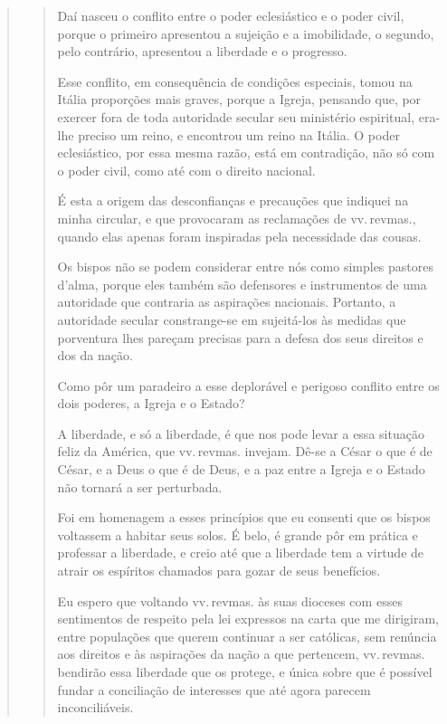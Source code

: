 \begin{quote}
\begin{quote}
Daí nasceu o conflito entre o poder eclesiástico e o poder civil, porque
o primeiro apresentou a sujeição e a imobilidade, o segundo, pelo
contrário, apresentou a liberdade e o progresso.

Esse conflito, em consequência de condições especiais, tomou na Itália
proporções mais graves, porque a Igreja, pensando que, por exercer fora
de toda autoridade secular seu ministério espiritual, era-lhe preciso um
reino, e encontrou um reino na Itália. O poder eclesiástico, por essa
mesma razão, está em contradição, não só com o poder civil, como até com
o direito nacional.

É esta a origem das desconfianças e precauções que indiquei na minha
circular, e que provocaram as reclamações de vv.\,revmas., quando elas
apenas foram inspiradas pela necessidade das cousas.

Os bispos não se podem considerar entre nós como simples pastores
d'alma, porque eles também são defensores e instrumentos de uma
autoridade que contraria as aspirações nacionais. Portanto, a autoridade
secular constrange-se em sujeitá-los às medidas que porventura lhes
pareçam precisas para a defesa dos seus direitos e dos da nação.

Como pôr um paradeiro a esse deplorável e perigoso conflito entre os
dois poderes, a Igreja e o Estado?

A liberdade, e só a liberdade, é que nos pode levar a essa situação
feliz da América, que vv.\,revmas. invejam. Dê-se a César o que é de
César, e a Deus o que é de Deus, e a paz entre a Igreja e o Estado não
tornará a ser perturbada.

Foi em homenagem a esses princípios que eu consenti que os bispos
voltassem a habitar seus solos. É belo, é grande pôr em prática e
professar a liberdade, e creio até que a liberdade tem a virtude de
atrair os espíritos chamados para gozar de seus benefícios.

Eu espero que voltando vv.\,revmas. às suas dioceses com esses
sentimentos de respeito pela lei expressos na carta que me dirigiram,
entre populações que querem continuar a ser católicas, sem renúncia aos
direitos e às aspirações da nação a que pertencem, vv.\,revmas. bendirão
essa liberdade que os protege, e única sobre que é possível fundar a
conciliação de interesses que até agora parecem inconciliáveis.
\end{quote}
\end{quote}

